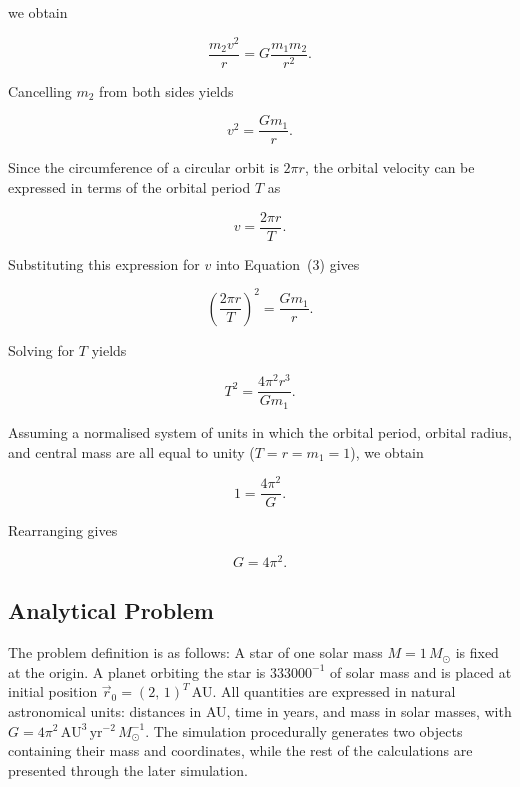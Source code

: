we obtain

\begin{equation}
    \frac{m_2 v^2}{r}
    =
    G\frac{m_1 m_2}{r^2}.
\end{equation}

Cancelling $m_2$ from both sides yields

\begin{equation}
    v^2 = \frac{Gm_1}{r}.
\end{equation}

Since the circumference of a circular orbit is $2\pi r$, the orbital velocity can be expressed in terms of the orbital period $T$ as

\begin{equation}
    v = \frac{2\pi r}{T}.
\end{equation}

Substituting this expression for $v$ into Equation~(3) gives

\begin{equation}
    \left(\frac{2\pi r}{T}\right)^2 = \frac{Gm_1}{r}.
\end{equation}

Solving for $T$ yields

\begin{equation}
    T^2 = \frac{4\pi^2 r^3}{Gm_1}.
\end{equation}

Assuming a normalised system of units in which the orbital period, orbital radius, and central mass are all equal to
unity ($T = r = m_1 = 1$), we obtain

\begin{equation}
    1 = \frac{4\pi^2}{G}.
\end{equation}

Rearranging gives

\begin{equation}
    G = 4\pi^2.
\end{equation}

\subsection{Analytical Problem}

The problem definition is as follows: A star of one solar mass $M = 1\,M_\odot$ is fixed at the origin.
A planet orbiting the star is $333000^{-1}$ of solar mass and is placed at initial position
$\vec{r}_0 = (2,\,1)^T$\,AU.
All quantities are expressed in natural astronomical units: distances in AU, time in years, and mass in
solar masses, with $G = 4\pi^2\,\mathrm{AU}^3\,\mathrm{yr}^{-2}\,M_\odot^{-1}$.
The simulation procedurally generates two objects containing their mass and coordinates, while the rest of the
calculations are presented through the later simulation.

